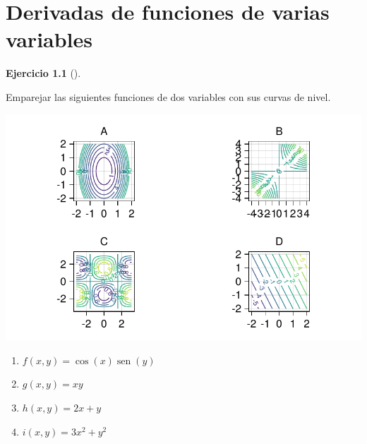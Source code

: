\documentclass[
  a4paper,
]{scrreport}
\theoremstyle{definition}
\newtheorem{exercise}{Ejercicio}[chapter]
\theoremstyle{remark}
\begin{document}
\begin{tcolorbox}[enhanced jigsaw, toprule=.15mm, bottomrule=.15mm, coltitle=black, toptitle=1mm, breakable, left=2mm, arc=.35mm, title=\textcolor{quarto-callout-tip-color}{\faLightbulb}\hspace{0.5em}{Solución}, titlerule=0mm, colback=white, colbacktitle=quarto-callout-tip-color!10!white, colframe=quarto-callout-tip-color-frame, bottomtitle=1mm, rightrule=.15mm, leftrule=.75mm, opacitybacktitle=0.6, opacityback=0]

\end{tcolorbox}


\hypertarget{derivadas-de-funciones-de-varias-variables}{%
\chapter{Derivadas de funciones de varias
variables}\label{derivadas-de-funciones-de-varias-variables}}

\begin{exercise}[]\protect\hypertarget{exr-curvas-nivel}{}\label{exr-curvas-nivel}

Emparejar las siguientes funciones de dos variables con sus curvas de
nivel.

\includegraphics{11-derivadas-funciones-varias-variables_files/figure-pdf/cell-2-output-1.pdf}

\begin{enumerate}
\def\labelenumi{\alph{enumi}.}
\item
  \(f(x,y) = \cos(x)\operatorname{sen}(y)\)
\item
  \(g(x,y) = xy\)
\item
  \(h(x,y) = 2x+y\)
\item
  \(i(x,y) = 3x^2 + y^2\)
\end{enumerate}

\end{exercise}
\end{document}
